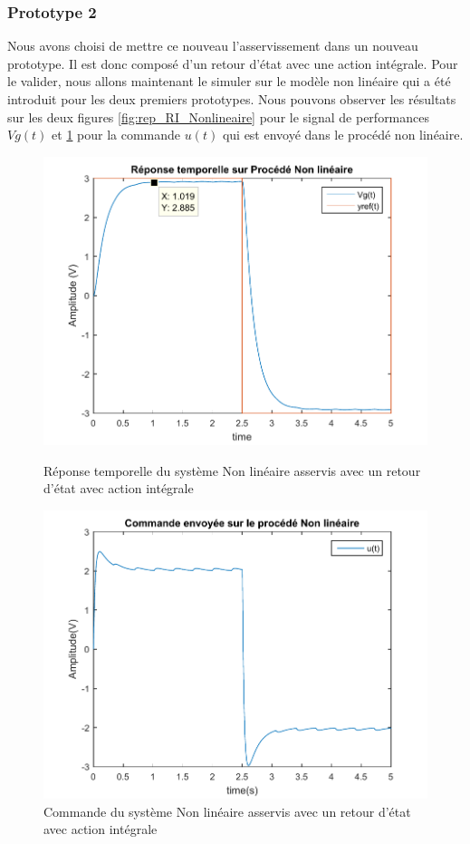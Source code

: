 		\subsubsection{Prototype 2}
		Nous avons choisi de mettre ce nouveau l'asservissement dans un nouveau prototype. Il est donc composé d'un retour d'état avec une action intégrale. Pour le valider, nous allons maintenant le simuler sur le modèle non linéaire qui a été introduit pour les deux premiers prototypes. Nous pouvons observer les résultats sur les deux figures \ref{fig:rep_RI_Nonlineaire} pour le signal de performances $Vg(t)$ et \ref{fig:com_RI_Nonlineaire} pour la commande $u(t)$ qui est envoyé dans le procédé non linéaire.
		\begin{figure}[!ht]
		\begin{minipage}{.5\textwidth}
		\includegraphics[width = \textwidth]{./IV/images/rep_RI_NonLineaire.pdf}
		\caption{Réponse temporelle du système Non linéaire asservis avec un retour d'état avec action intégrale\label{fig:rep_RI_Nonlineaire}}
\end{minipage}
\begin{minipage}{.5\textwidth}
\includegraphics[width = \textwidth]{./IV/images/com_RI_Nonlineaire.pdf}
\caption{Commande du système Non linéaire asservis avec un retour d'état avec action intégrale\label{fig:com_RI_Nonlineaire}}
\end{minipage}
		\end{figure}
